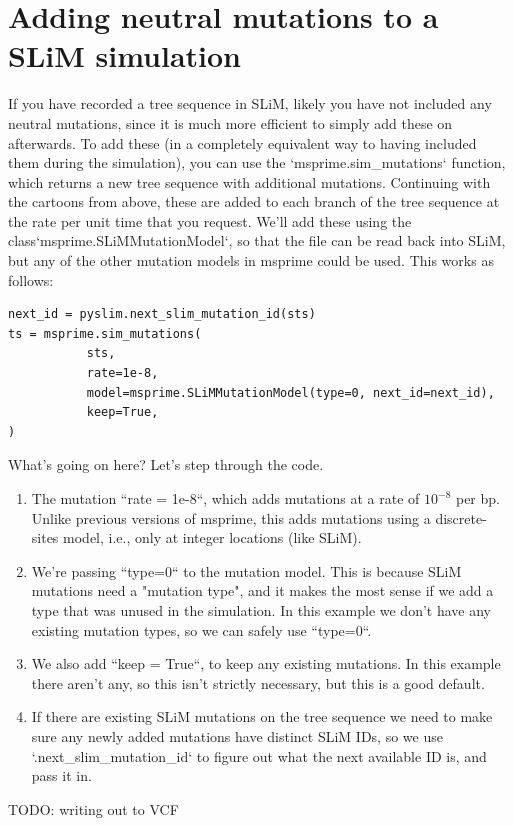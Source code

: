 \documentclass[12pt]{article}
\begin{document}
\section{Adding neutral mutations to a SLiM simulation}


If you have recorded a tree sequence in SLiM, likely you have not included any neutral mutations,
since it is much more efficient to simply add these on afterwards.
To add these (in a completely equivalent way to having included them during the simulation),
you can use the `msprime.sim\_mutations` function, which returns a new tree sequence with additional mutations.
Continuing with the cartoons from above, these are added to each branch of the tree sequence
at the rate per unit time that you request.
We'll add these using the {class}`msprime.SLiMMutationModel`, so that the file can be read back into SLiM,
but any of the other mutation models in msprime could be used.
This works as follows:
\begin{verbatim}
next_id = pyslim.next_slim_mutation_id(sts)
ts = msprime.sim_mutations(
           sts,
           rate=1e-8,
           model=msprime.SLiMMutationModel(type=0, next_id=next_id),
           keep=True,
)
\end{verbatim}


What's going on here? Let's step through the code.

\begin{enumerate}
    \item The mutation ``rate = 1e-8``, which adds mutations at a rate of $10^{-8}$ per bp.
    Unlike previous versions of msprime, this adds mutations using a discrete-sites model,
    i.e., only at integer locations (like SLiM).

\item We're passing ``type=0`` to the mutation model.
    This is because SLiM mutations need a "mutation type",
    and it makes the most sense if we add a type that was unused in the simulation.
    In this example we don't have any existing mutation types, so we can safely use ``type=0``.

\item We also add ``keep = True``, to keep any existing mutations.
    In this example there aren't any, so this isn't strictly necessary,
    but this is a good default.

\item If there are existing SLiM mutations on the tree sequence we need to
    make sure any newly added mutations have distinct SLiM IDs,
    so we use `.next\_slim\_mutation\_id` to figure out
    what the next available ID is, and pass it in.

\end{enumerate}

TODO: writing out to VCF
\end{document}

